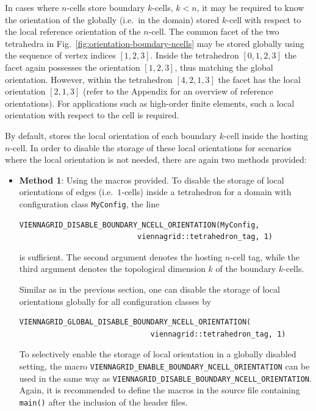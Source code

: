 \begin{itemize}
In cases where $n$-cells store boundary $k$-cells, $k<n$, it may be required to know the orientation of the globally (i.e.~in the domain) stored $k$-cell with respect to the local reference orientation of the $n$-cell. The common facet of the two tetrahedra in Fig.~\ref{fig:orientation-boundary-ncells} may be stored globally using the sequence of vertex indices $[1, 2, 3]$. Inside the tetrahedron $[0, 1, 2, 3]$ the facet again possesses the orientation $[1, 2, 3]$, thus matching the global orientation. However, within the tetrahedron $[4, 2, 1, 3]$ the facet has the local orientation $[2, 1, 3]$ (refer to the Appendix for an overview of reference orientations). For applications such as high-order finite elements, such a local orientation with respect to the cell is required.


By default, {\ViennaGrid} stores the local orientation of each boundary $k$-cell inside the hosting $n$-cell. In order to disable the storage of these local orientations for scenarios where the local orientation is not needed, there are again two methods provided:
\begin{itemize}
 \item \textbf{Method 1}: Using the macros provided. To disable the storage of local orientations of edges (i.e.~$1$-cells) inside a tetrahedron for a domain with configuration class \lstinline|MyConfig|, the line
\begin{lstlisting}
VIENNAGRID_DISABLE_BOUNDARY_NCELL_ORIENTATION(MyConfig,
                           viennagrid::tetrahedron_tag, 1) 
\end{lstlisting}
is sufficient. The second argument denotes the hosting $n$-cell tag, while the third argument denotes the topological dimension $k$ of the boundary $k$-cells.

Similar as in the previous section, one can disable the storage of local orientations globally for all configuration classes by
\begin{lstlisting}
VIENNAGRID_GLOBAL_DISABLE_BOUNDARY_NCELL_ORIENTATION(
                              viennagrid::tetrahedron_tag, 1) 
\end{lstlisting}
To selectively enable the storage of local orientation in a globally disabled setting, the macro \lstinline|VIENNAGRID_ENABLE_BOUNDARY_NCELL_ORIENTATION| can be used in the same way as \lstinline|VIENNAGRID_DISABLE_BOUNDARY_NCELL_ORIENTATION|.
Again, it is recommended to define the macros in the source file containing \lstinline|main()| after the inclusion of the {\ViennaGrid} header files.


\end{itemize}
\end{itemize}
